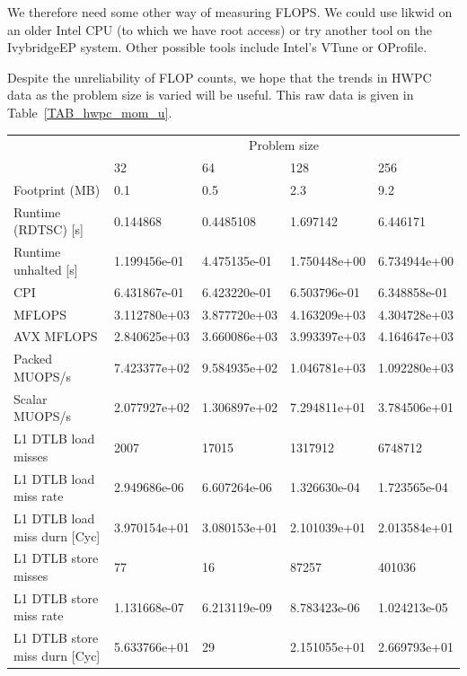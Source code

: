 \documentclass[12pt]{article}
\begin{document}
We therefore need some other way of measuring FLOPS. We could use
likwid on an older Intel CPU (to which we have root access) or try
another tool on the IvybridgeEP system. Other possible tools include
Intel's VTune or OProfile.

Despite the unreliability of FLOP counts, we hope that the trends in
HWPC data as the problem size is varied will be useful. This raw data
is given in Table~\ref{TAB_hwpc_mom_u}.

\begin{table}
\begin{tabular}{l|l|l|l|l}
\hline
\hline
               & \multicolumn{4}{c}{Problem size} \\
               & 32     &    64        &    128       &   256 \\
\hline
Footprint (MB) & 0.1 & 0.5          & 2.3          & 9.2 \\
\hline
Runtime (RDTSC) [s]   & 0.144868 &  0.4485108   &   1.697142   &   6.446171  \\
Runtime unhalted [s]  & 1.199456e-01 & 4.475135e-01 & 1.750448e+00 &   6.734944e+00 \\
CPI                   & 6.431867e-01 & 6.423220e-01 & 6.503796e-01 &   6.348858e-01 \\
\hline
MFLOPS           & 3.112780e+03 & 3.877720e+03  & 4.163209e+03 & 4.304728e+03 \\
AVX MFLOPS       & 2.840625e+03 & 3.660086e+03  & 3.993397e+03 & 4.164647e+03 \\
Packed MUOPS/s   & 7.423377e+02 & 9.584935e+02  & 1.046781e+03 & 1.092280e+03 \\
Scalar MUOPS/s   & 2.077927e+02 & 1.306897e+02  & 7.294811e+01 & 3.784506e+01 \\
\hline
L1 DTLB load misses          &      2007     &      17015   &    1317912   &    6748712   \\
L1 DTLB load miss rate       &  2.949686e-06 &  6.607264e-06& 1.326630e-04 & 1.723565e-04 \\
L1 DTLB load miss durn [Cyc] &  3.970154e+01 &  3.080153e+01& 2.101039e+01 & 2.013584e+01 \\
L1 DTLB store misses         &       77      &       16     &     87257    &    401036    \\
L1 DTLB store miss rate      &  1.131668e-07 &  6.213119e-09& 8.783423e-06 & 1.024213e-05 \\
L1 DTLB store miss durn [Cyc]&  5.633766e+01 &       29     & 2.151055e+01 & 2.669793e+01 \\

\end{tabular}
\end{table}
\end{document}
